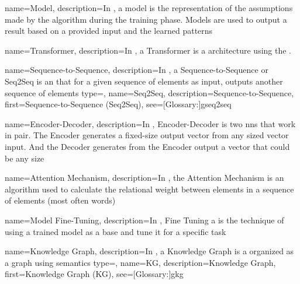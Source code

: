 
{
  name={Model},
  description={In , a model is the representation of the assumptions made by the algorithm during the training phase. Models are used to output a result based on a provided input and the learned patterns}
}

{
  name={Transformer},
  description={In , a Transformer is a  architecture using the .}
}

{
  name={Sequence-to-Sequence},
  description={In , a Sequence-to-Sequence or Seq2Seq is an   that for a given sequence of elements as input, outputs another sequence of elements}
}
{
  type=\acronymtype,
  name={Seq2Seq},
  description={Sequence-to-Sequence},
  first={Sequence-to-Sequence (Seq2Seq)},
  see=[Glossary:]{gseq2seq}
}

{
  name={Encoder-Decoder},
  description={In , Encoder-Decoder is two \glspl{nn} that work in pair. The Encoder generates a fixed-size output vector from any sized vector input. And the Decoder generates from the Encoder output a vector that could be any size}
}

{
  name={Attention Mechanism},
  description={In , the Attention Mechanism is an algorithm used to calculate the relational weight between elements in a sequence of elements (most often words)}
}

{
  name={Model Fine-Tuning},
  description={In , Fine Tuning a  is the technique of using a trained  model as a base and tune it for a specific task}
}

{
  name={Knowledge Graph},
  description={In , a Knowledge Graph is a  organized as a graph using semantics}
}
{
  type=\acronymtype,
  name={KG},
  description={Knowledge Graph},
  first={Knowledge Graph (KG)},
  see=[Glossary:]{gkg}
}

